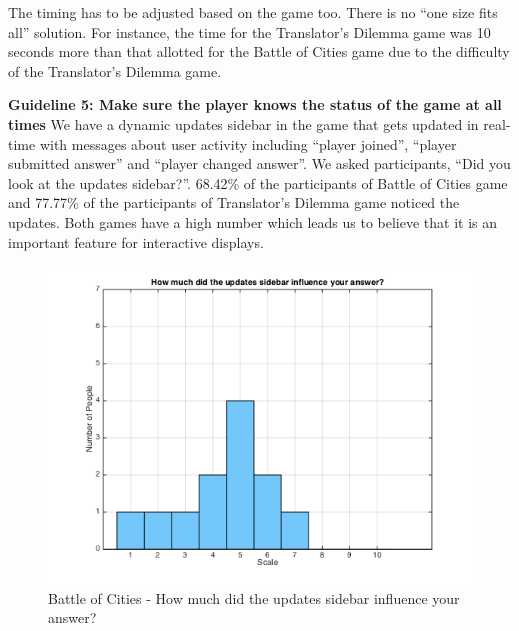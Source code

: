 \documentclass{sig-alternate}
\begin{document}
The timing has to be adjusted based on the game too. There is no ``one size fits all'' solution. For instance, the time for the Translator's Dilemma game was 10 seconds more than that allotted for the Battle of Cities game due to the difficulty of the Translator's Dilemma game.

\textbf{Guideline 5: Make sure the player knows the status of the game at all times}
We have a dynamic updates sidebar in the game that gets updated in real-time with messages about user activity including ``player joined'', ``player submitted answer'' and ``player changed answer''. We asked participants, ``Did you look at the updates sidebar?''. 68.42\% of the participants of Battle of Cities game and 77.77\% of the participants of Translator's Dilemma game noticed the updates. Both games have a high number which leads us to believe that it is an important feature for interactive displays.

\begin{figure}
	\includegraphics[width=\linewidth]{p_influence.png}
	\caption{Battle of Cities - How much did the updates sidebar influence your answer?}
	\label{fig:p_influence}
\end{figure}
\end{document}
